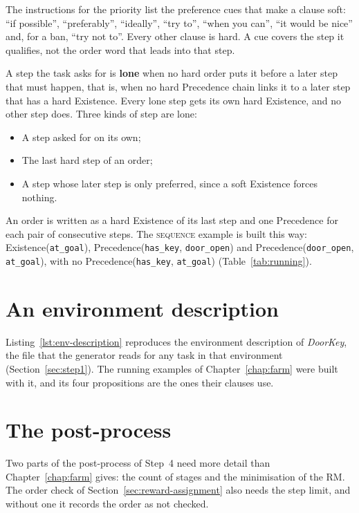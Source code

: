 \documentclass[11pt,english,listoffigures,listoftables]{tfgetsinf}
\newcommand{\runex}[1]{\textsc{#1}}  %
\newcommand{\env}[1]{\textsf{\slshape #1}}  %
\begin{document}
The instructions for the priority list the preference cues that make a clause soft: ``if possible'', ``preferably'', ``ideally'', ``try to'', ``when you can'', ``it would be nice'' and, for a ban, ``try not to''. Every other clause is hard. A cue covers the step it qualifies, not the order word that leads into that step.

A step the task asks for is \textbf{lone} when no hard order puts it before a later step that must happen, that is, when no hard Precedence chain links it to a later step that has a hard Existence. Every lone step gets its own hard Existence, and no other step does. Three kinds of step are lone:
\begin{itemize}
    \item A step asked for on its own;
    \item The last hard step of an order;
    \item A step whose later step is only preferred, since a soft Existence forces nothing.
\end{itemize}

An order is written as a hard Existence of its last step and one Precedence for each pair of consecutive steps. The \runex{sequence} example is built this way: Existence(\texttt{at\_goal}), Precedence(\texttt{has\_key}, \texttt{door\_open}) and Precedence(\texttt{door\_open}, \texttt{at\_goal}), with no \mbox{Precedence}(\texttt{has\_key}, \texttt{at\_goal}) (Table~\ref{tab:running}).

\section{An environment description}
\label{app:env-description}
Listing~\ref{lst:env-description} reproduces the environment description of \env{DoorKey}, the file that the generator reads for any task in that environment (Section~\ref{sec:step1}). The running examples of Chapter~\ref{chap:farm} were built with it, and its four propositions are the ones their clauses use.



\section{The post-process}
Two parts of the post-process of Step~4 need more detail than Chapter~\ref{chap:farm} gives: the count of stages and the minimisation of the RM. The order check of Section~\ref{sec:reward-assignment} also needs the step limit, and without one it records the order as not checked.
\end{document}

